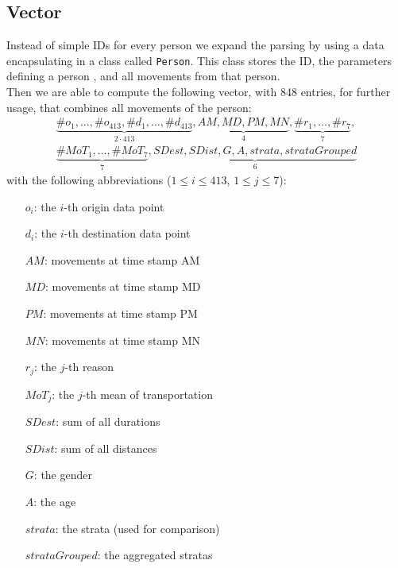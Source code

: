\documentclass[runningheads]{llncs}
\begin{document}
	\subsection{Vector}
	Instead of simple IDs for every person we expand the parsing by using a data encapsulating in a class called \texttt{Person}. This class stores the ID, the parameters defining a person %
	, and all movements from that person.\\
	Then we are able to compute the following vector, with 848 entries, for further usage, that combines all movements of the person:
	\begin{align*}
	\underbrace{\#o_1, \dots, \#o_{413}, \#d_1, \dots, \#d_{413}}_{2\cdot 413} ,
	\underbrace{\mathit{AM}, \mathit{MD}, \mathit{PM}, \mathit{MN}}_{4}, 
	\underbrace{\#r_1, \dots, \#r_7}_{7}, \\
	\underbrace{\#\mathit{MoT}_1, \dots, \#\mathit{MoT}_7}_{7}, \underbrace{\mathit{SDest}, \mathit{SDist}, \mathit{G}, \mathit{A} ,\mathit{strata}, \mathit{strataGrouped}}_{6}
	\end{align*}
	with the following abbreviations ($1 \le i \le 413$, $1 \le j \le 7$):
	\begin{multicols}{2}
		\begin{itemize}
			\setlength{\itemindent}{.4cm}
			\item[$o_i$:]  the $i$-th origin data point
			\item[$d_i$:]  the $i$-th destination data point
			\item[$\mathit{AM}$:] movements at time stamp AM
			\item[$\mathit{MD}$:] movements at time stamp MD
			\item[$\mathit{PM}$:] movements at time stamp PM
			\item[$\mathit{MN}$:] movements at time stamp MN
			\item[$r_j$:] the $j$-th reason
			\item[$\mathit{MoT}_j$:] the $j$-th mean of transportation
			\item[$\mathit{SDest}$:] sum of all durations
			\item[$\mathit{SDist}$:] sum of all distances
			\item[$\mathit{G}$:] the gender
			\item[$\mathit{A}$:] the age
			\item[$strata$:] the strata (used for comparison)
			\item[$strataGrouped$:] the aggregated stratas
		\end{itemize}
	\end{multicols}
\end{document}
